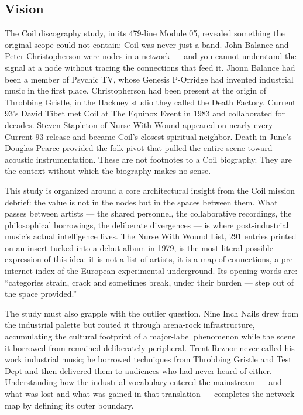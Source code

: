 \documentclass[11pt,letterpaper]{article}
\begin{document}
\subsection{Vision}

The Coil discography study, in its 479-line Module 05, revealed something the original scope could not
contain: Coil was never just a band. John Balance and Peter Christopherson were nodes in a network
— and you cannot understand the signal at a node without tracing the connections that feed it.
Jhonn Balance had been a member of Psychic TV, whose Genesis P-Orridge had invented industrial music in
the first place. Christopherson had been present at the origin of Throbbing Gristle, in the Hackney
studio they called the Death Factory. Current 93's David Tibet met Coil at The Equinox Event in 1983 and
collaborated for decades. Steven Stapleton of Nurse With Wound appeared on nearly every Current 93
release and became Coil's closest spiritual neighbor. Death in June's Douglas Pearce provided the folk
pivot that pulled the entire scene toward acoustic instrumentation. These are not footnotes to a Coil
biography. They are the context without which the biography makes no sense.

This study is organized around a core architectural insight from the Coil mission debrief: the value is
not in the nodes but in the spaces between them. What passes between artists — the shared personnel,
the collaborative recordings, the philosophical borrowings, the deliberate divergences — is where
post-industrial music's actual intelligence lives. The Nurse With Wound List, 291 entries printed on an
insert tucked into a debut album in 1979, is the most literal possible expression of this idea: it is
not a list of artists, it is a map of connections, a pre-internet index of the European experimental
underground. Its opening words are: ``categories strain, crack and sometimes break, under their burden —
step out of the space provided.''

The study must also grapple with the outlier question. Nine Inch Nails drew from the industrial palette
but routed it through arena-rock infrastructure, accumulating the cultural footprint of a major-label
phenomenon while the scene it borrowed from remained deliberately peripheral. Trent Reznor never called
his work industrial music; he borrowed techniques from Throbbing Gristle and Test Dept and then
delivered them to audiences who had never heard of either. Understanding how the industrial vocabulary
entered the mainstream — and what was lost and what was gained in that translation — completes the
network map by defining its outer boundary.
\end{document}
